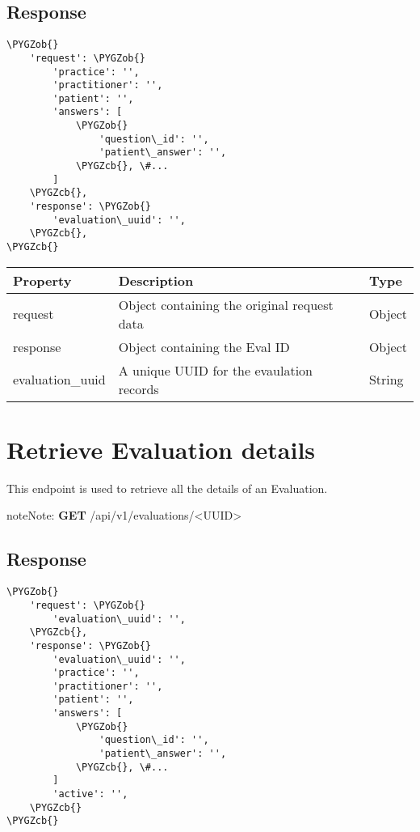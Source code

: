 \documentclass[letterpaper,10pt,english]{sphinxmanual}
\def\PYGZob{\char`\{}
\def\PYGZcb{\char`\}}
\begin{document}
\subsection{Response}
\label{dev-api-evaluations:response}
\begin{Verbatim}[commandchars=\\\{\}]
\PYGZob{}
    'request': \PYGZob{}
        'practice': '',
        'practitioner': '',
        'patient': '',
        'answers': [
            \PYGZob{}
                'question\_id': '',
                'patient\_answer': '',
            \PYGZcb{}, \#...
        ]
    \PYGZcb{},
    'response': \PYGZob{}
        'evaluation\_uuid': '',
    \PYGZcb{},
\PYGZcb{}
\end{Verbatim}

\begin{tabulary}{\linewidth}{|L|L|L|}
\hline
\textsf{\relax 
Property
} & \textsf{\relax 
Description
} & \textsf{\relax 
Type
}\\
\hline
request
 & 
Object containing the original
request data
 & 
Object
\\

response
 & 
Object containing the Eval ID
 & 
Object
\\

evaluation\_uuid
 & 
A unique UUID for the evaulation
records
 & 
String
\\
\hline\end{tabulary}



\section{Retrieve Evaluation details}
\label{dev-api-evaluations:retrieve-evaluation-details}
This endpoint is used to retrieve all the details of an Evaluation.

\begin{notice}{note}{Note:}
\textbf{GET} /api/v1/evaluations/\textless{}UUID\textgreater{}
\end{notice}


\subsection{Response}
\label{dev-api-evaluations:id1}
\begin{Verbatim}[commandchars=\\\{\}]
\PYGZob{}
    'request': \PYGZob{}
        'evaluation\_uuid': '',
    \PYGZcb{},
    'response': \PYGZob{}
        'evaluation\_uuid': '',
        'practice': '',
        'practitioner': '',
        'patient': '',
        'answers': [
            \PYGZob{}
                'question\_id': '',
                'patient\_answer': '',
            \PYGZcb{}, \#...
        ]
        'active': '',
    \PYGZcb{}
\PYGZcb{}
\end{Verbatim}
\end{document}
